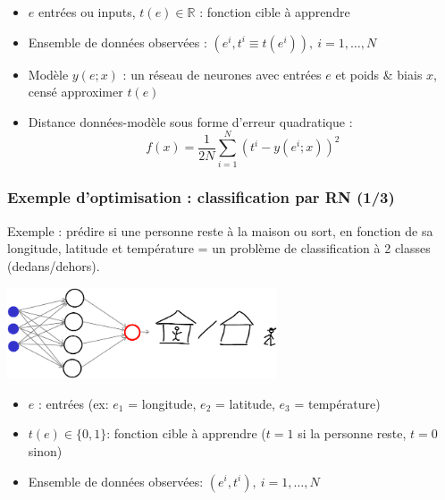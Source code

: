 \documentclass[12pt]{beamer}
\begin{document}
\begin{frame}
\begin{itemize}
\item $e$ entrées ou inputs, $t(e) \in \mathbb R$ : fonction cible à apprendre
\item Ensemble de \alert{données} observées : $(e^i,t^i \equiv t(e^i)),~ i=1,\ldots,N$
\item \alert{Modèle} $y(e;x)$ : un réseau de neurones avec entrées $e$ et poids & biais $x$, censé approximer $t(e)$
\item \alert{Distance données-modèle} sous forme d’erreur quadratique :
\begin{equation*}
f(x) = \frac{1}{2N} \sum_{i=1}^N (t^i - y(e^i;x))^2
\end{equation*}
\end{itemize}
\end{frame}



\begin{frame}
\frametitle{Exemple d'optimisation : classification par RN (1/3)}
Exemple : prédire si une personne reste à la maison ou sort, en fonction de sa longitude, latitude et température = un problème de classification à 2 classes (dedans/dehors).\\
\begin{center}
\includegraphics[width=0.6\textwidth]{neuralnet3-4-1-classif-crop.pdf}\\
\end{center}
\begin{itemize}
\item $e$ : entrées (ex: $e_1$ = longitude, $e_2$ = latitude, $e_3$ = température)
\item $t(e) \in \{0,1\}$: fonction cible à apprendre ($t=1$ si la personne reste, $t=0$ sinon)
\item Ensemble de \alert{données} observées: $(e^i,t^i),~ i=1,\ldots,N$
\end{itemize}
\end{frame}
\end{document}
